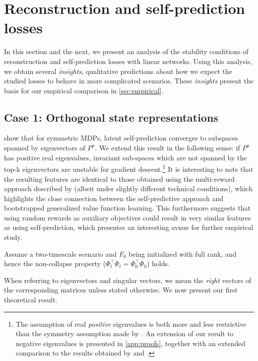 \section{Reconstruction and self-prediction losses}
\label{sec:stand_alone_tasks}

In this section and the next, we present an analysis of the stability conditions of reconstruction and self-prediction losses with linear networks.
Using this analysis, we obtain several \emph{insights}, qualitative predictions about how we expect the studied losses to behave in more complicated scenarios.
These \emph{insights} present the basis for our empirical comparison in \autoref{sec:empirical}.

\subsection{Case 1: Orthogonal state representations}


\cite{tang2022understanding} show that for symmetric MDPs, latent self-prediction converges to subspaces spanned by eigenvectors of $P^\pi$. 
We extend this result in the following sense: if $P^\pi$ has positive real eigenvalues, invariant sub-spaces which are not spanned by the top-k eigenvectors are unstable for gradient descent.\footnote{The assumption of real \emph{positive} eigenvalues is both more and less restrictive than the symmetry assumption made by \textcite{tang2022understanding}. An extension of our result to negative eigenvalues is presented in \autoref{app:proofs}, together with an extended comparison to the results obtained by \textcite{tang2022understanding} and \textcite{lelan2023bootstrapped}.}
It is interesting to note that the resulting features are identical to those obtained using the multi-reward approach described by \cite{lelan2023bootstrapped} (albeit under slightly different technical conditions), which highlights the close connection between the self-predictive approach and bootstrapped generalized value function learning.
This furthermore suggests that using random rewards as auxiliary objectives \parencite{farebrother2023protovalue} could result in very similar features as using self-prediction, which presentes an interesting avnue for further empirical study.

\begin{assumption}
\label{assumption3}
    Assume a two-timescale scenario and $F_0$ being initialized with full rank, and hence the non-collapse property ($\Phi_t^\top\Phi_t = \Phi_0^\top\Phi_0$) \parencite{tang2022understanding} holds.
\end{assumption}
When referring to eigenvectors and singular vectors, we mean the \emph{right} vectors of the corresponding matrices unless stated otherwise.
We now present our first theoretical result.

